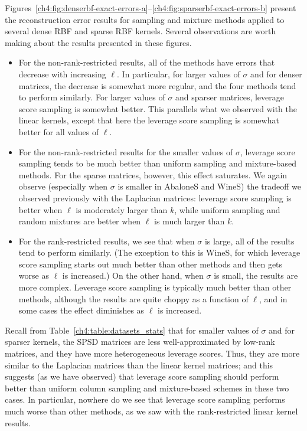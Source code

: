 Figures~\ref{ch4:fig:denserbf-exact-errors-a}--\ref{ch4:fig:sparserbf-exact-errors-b} 
present 
the reconstruction error results for sampling and mixture methods 
applied to several dense RBF and sparse RBF kernels.
Several observations are worth making about the results presented in these 
figures.
\begin{itemize}
\item
For the non-rank-restricted results, all of the methods have errors that 
decrease with increasing $\ell$.
In particular, for larger values of $\sigma$ and for denser matrices, the 
decrease is somewhat more regular, and the four methods tend to perform 
similarly.
For larger values of $\sigma$ and sparser matrices, leverage
score sampling is somewhat better.
This parallels what we observed with the linear kernels, except that here the 
leverage score sampling is somewhat better for all values of $\ell$.
\item
For the non-rank-restricted results for the smaller values of $\sigma$, 
leverage score sampling tends to be much better than uniform sampling and 
mixture-based methods.
For the sparse matrices, however, this effect saturates. We again observe 
(especially when $\sigma$ is smaller in AbaloneS and WineS) the tradeoff we 
observed previously with the Laplacian matrices: leverage score sampling is 
better when $\ell$ is moderately larger than $k$, while uniform sampling and 
random mixtures are better when $\ell$ is much larger than $k$.
\item
For the rank-restricted results, we see that when $\sigma$ is large, all 
of the results tend to perform similarly.
(The exception to this is WineS, for which leverage score sampling starts out 
much better than other methods and then gets worse as $\ell$ is increased.)
On the other hand, when $\sigma$ is small, the results are more complex.
Leverage score sampling is typically much better than other methods, 
although the results are quite choppy as a function of $\ell$, and in some 
cases the effect diminishes as $\ell$ is increased.
\end{itemize}
Recall from Table~\ref{ch4:table:datasets_stats} that for smaller values of 
$\sigma$ and for sparser kernels, the SPSD matrices are less 
well-approximated by low-rank matrices, and they have more heterogeneous 
leverage scores.
Thus, they are more similar to the Laplacian matrices than the linear kernel 
matrices; and this suggests (as we have observed) that leverage score sampling 
should perform better than uniform column sampling and 
mixture-based schemes in these two cases.
In particular, nowhere do we see that leverage score sampling performs much 
worse than other methods, as we saw with the rank-restricted linear 
kernel results.

